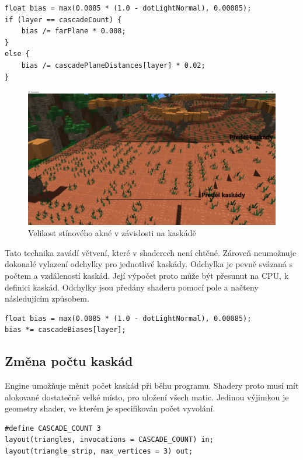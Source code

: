 \documentclass[thesis=M,czech]{FITthesis}[2019/12/23]
\begin{document}
\begin{verbatim}
float bias = max(0.0085 * (1.0 - dotLightNormal), 0.00085);
if (layer == cascadeCount) {
    bias /= farPlane * 0.008;
}
else {
    bias /= cascadePlaneDistances[layer] * 0.02;
}
\end{verbatim}

\begin{figure}\centering
	\includegraphics[width=\textwidth]{images/shadows/csm_acne}
	\caption[Velikost stínového akné v závislosti na kaskádě]{Velikost stínového akné v závislosti na kaskádě}\label{fig:shadows_csm_acne}
\end{figure}

Tato technika zavádí větvení, které v shaderech není chtěné. Zároveň neumožnuje dokonalé vylazení odchylky pro jednotlivé kaskády. Odchylka je pevně svázaná s počtem a vzdáleností kaskád. Její výpočet proto může být přesunut na CPU, k definici kaskád. Odchylky jsou předány shaderu pomocí pole a načteny následujícím způsobem.

\begin{verbatim}
float bias = max(0.0085 * (1.0 - dotLightNormal), 0.00085);
bias *= cascadeBiases[layer];
\end{verbatim}

\subsection{Změna počtu kaskád}

Engine umožňuje měnit počet kaskád při běhu programu. Shadery proto musí mít alokované dostatečně velké místo, pro uložení všech matic. Jedinou výjimkou je geometry shader, ve kterém je specifikován počet vyvolání.

\begin{verbatim}
#define CASCADE_COUNT 3
layout(triangles, invocations = CASCADE_COUNT) in;
layout(triangle_strip, max_vertices = 3) out;
\end{verbatim}
\end{document}

